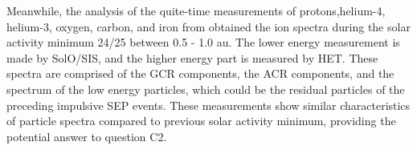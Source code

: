 Meanwhile, the analysis of the quite-time measurements of protons,helium-4, helium-3, oxygen, carbon, and iron from \citet{Mason-2021-SolOQuietTime} obtained the ion spectra during the solar activity minimum 24/25 between 0.5 - 1.0 au. The lower energy measurement is made by \acs{SolO}/\acs{SIS}, and the higher energy part is measured by \acs{HET}. These spectra are comprised of the \ac{GCR} components, the \ac{ACR} components, and the spectrum of the low energy particles, which could be the residual particles of the preceding impulsive \acs{SEP} events. These measurements show similar characteristics of particle spectra compared to previous solar activity minimum, providing the potential answer to question C2.




